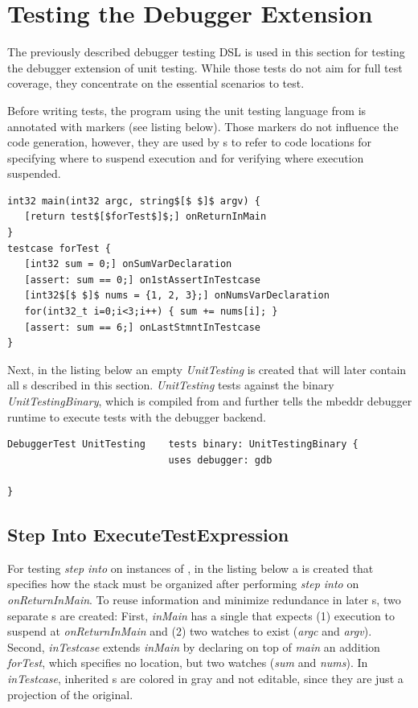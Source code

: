 \section{Testing the Debugger Extension}

The previously described debugger testing \ac{DSL} is used in this section for
testing the debugger extension of unit testing. While those
tests do not aim for full test coverage, they concentrate on the essential
scenarios to test.

Before writing tests, the program using the unit testing
language from  is annotated with markers
(see listing below). Those markers do not influence the code generation,
however, they are used by s to refer to code locations
for specifying where to suspend execution and for verifying where
execution suspended.

\begin{lstlisting}[language=markerDSL]
int32 main(int32 argc, string$[$ $]$ argv) {
   [return test$[$forTest$]$;] onReturnInMain
}
testcase forTest {
   [int32 sum = 0;] onSumVarDeclaration
   [assert: sum == 0;] on1stAssertInTestcase
   [int32$[$ $]$ nums = {1, 2, 3};] onNumsVarDeclaration
   for(int32_t i=0;i<3;i++) { sum += nums[i]; }
   [assert: sum == 6;] onLastStmntInTestcase
}
\end{lstlisting}	

Next, in the listing below an empty  \emph{UnitTesting} is
created that will later contain all s described in this
section. \emph{UnitTesting} tests against the binary \emph{UnitTestingBinary},
which is compiled from  and further tells the mbeddr
debugger runtime to execute tests with the  debugger backend.

\begin{lstlisting}[language=testingDSL]
DebuggerTest UnitTesting    tests binary: UnitTestingBinary {
                            uses debugger: gdb

}  
\end{lstlisting}

\subsection{Step Into ExecuteTestExpression}

For testing \emph{step into} on instances of ,
in the listing below a  is created that specifies how
the stack must be organized after performing \emph{step
into} on \emph{onReturnInMain}. To reuse information and 
minimize redundance in later
s, two separate 
s are created: First, \emph{inMain} 
has a single  that expects (1) execution to suspend at  
\emph{onReturnInMain} and (2) two watches to exist (\emph{argc} and
\emph{argv}). Second, \emph{inTestcase} extends
\emph{inMain} by declaring on top of \emph{main} an addition
 \emph{forTest}, which specifies no location, but two
watches (\emph{sum} and \emph{nums}). In \emph{inTestcase}, inherited
s are colored in gray and not editable, since they are
just a projection of the original.

